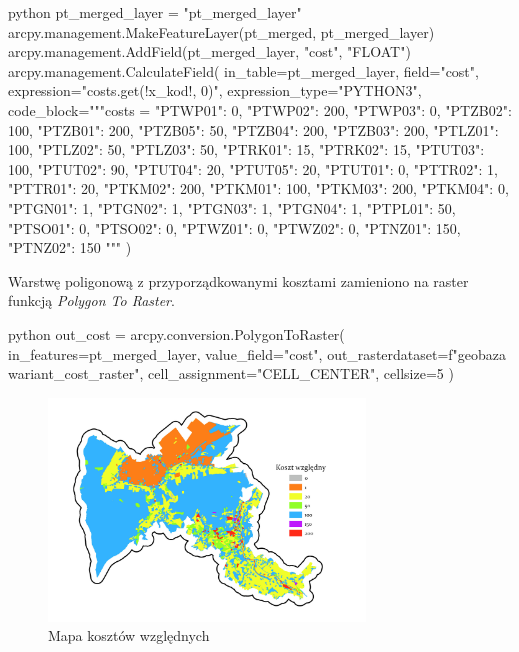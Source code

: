 \documentclass{article}
\begin{document}
\begin{mintedbox}{python}
pt_merged_layer = "pt_merged_layer"
arcpy.management.MakeFeatureLayer(pt_merged, pt_merged_layer)
arcpy.management.AddField(pt_merged_layer, "cost", "FLOAT")
arcpy.management.CalculateField(
    in_table=pt_merged_layer,
    field="cost",
    expression="costs.get(!x_kod!, 0)",
    expression_type="PYTHON3",
    code_block="""costs = {
    "PTWP01": 0, 
    "PTWP02": 200,
    "PTWP03": 0,
    "PTZB02": 100,
    "PTZB01": 200,
    "PTZB05": 50,
    "PTZB04": 200,
    "PTZB03": 200,
    "PTLZ01": 100,
    "PTLZ02": 50,
    "PTLZ03": 50,
    "PTRK01": 15,
    "PTRK02": 15,
    "PTUT03": 100,
    "PTUT02": 90,
    "PTUT04": 20,
    "PTUT05": 20,
    "PTUT01": 0,
    "PTTR02": 1,
    "PTTR01": 20,
    "PTKM02": 200,
    "PTKM01": 100,
    "PTKM03": 200,
    "PTKM04": 0,
    "PTGN01": 1,
    "PTGN02": 1,
    "PTGN03": 1,
    "PTGN04": 1,
    "PTPL01": 50,
    "PTSO01": 0,
    "PTSO02": 0,
    "PTWZ01": 0,
    "PTWZ02": 0,
    "PTNZ01": 150,
    "PTNZ02": 150
    }"""
)
\end{mintedbox}
\vspace{10pt}

Warstwę poligonową z przyporządkowanymi kosztami zamieniono na raster funkcją \textit{Polygon To Raster}.
\vspace{5pt}

\begin{mintedbox}{python}
out_cost = arcpy.conversion.PolygonToRaster(
    in_features=pt_merged_layer,
    value_field="cost",
    out_rasterdataset=f"{geobaza}\\{wariant}_cost_raster",
    cell_assignment="CELL_CENTER",
    cellsize=5
)
\end{mintedbox}
\vspace{5pt}

\begin{figure}[H]
    \centering
    \includegraphics[width=0.75\textwidth]{img/cost-raster.jpg}
    \caption{Mapa kosztów względnych}
\end{figure}
\vspace{10pt}
\end{document}
